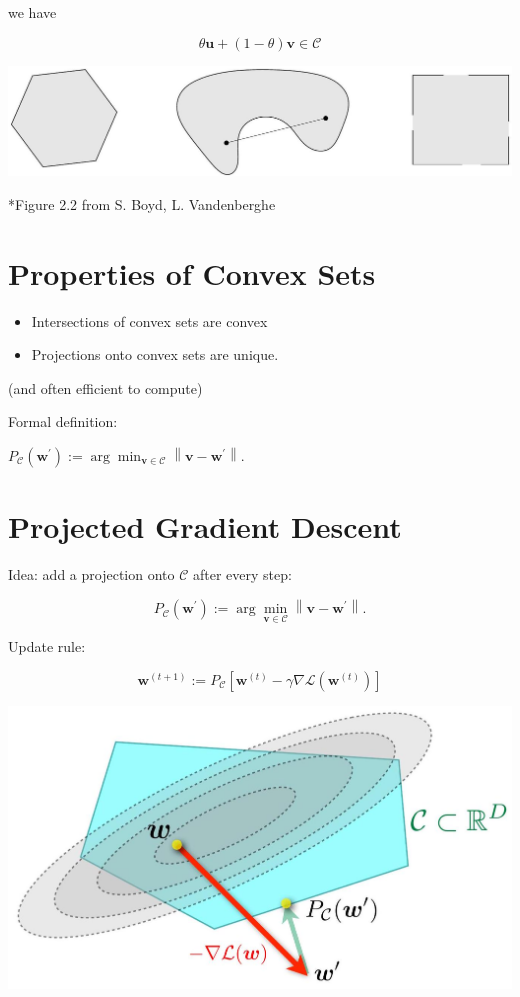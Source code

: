\documentclass[10pt]{article}
\begin{document}
we have

$$
\theta \mathbf{u}+(1-\theta) \mathbf{v} \in \mathcal{C}
$$

\begin{center}
\includegraphics[max width=\textwidth]{2023_12_30_4ff132a3450066e65b4fg-16}
\end{center}

*Figure 2.2 from S. Boyd, L. Vandenberghe

\section*{Properties of Convex Sets}
\begin{itemize}
  \item Intersections of convex sets are convex
  \item Projections onto convex sets are unique.
\end{itemize}

(and often efficient to compute)

Formal definition:

$P_{\mathcal{C}}\left(\mathbf{w}^{\prime}\right):=\arg \min _{\mathbf{v} \in \mathcal{C}}\left\|\mathbf{v}-\mathbf{w}^{\prime}\right\|$.

\section*{Projected Gradient Descent}
Idea: add a projection onto $\mathcal{C}$ after every step:

$$
P_{\mathcal{C}}\left(\mathbf{w}^{\prime}\right):=\arg \min _{\mathbf{v} \in \mathcal{C}}\left\|\mathbf{v}-\mathbf{w}^{\prime}\right\| .
$$

Update rule:

$$
\mathbf{w}^{(t+1)}:=P_{\mathcal{C}}\left[\mathbf{w}^{(t)}-\gamma \nabla \mathcal{L}\left(\mathbf{w}^{(t)}\right)\right]
$$

\begin{center}
\includegraphics[max width=\textwidth]{2023_12_30_4ff132a3450066e65b4fg-17}
\end{center}
\end{document}
